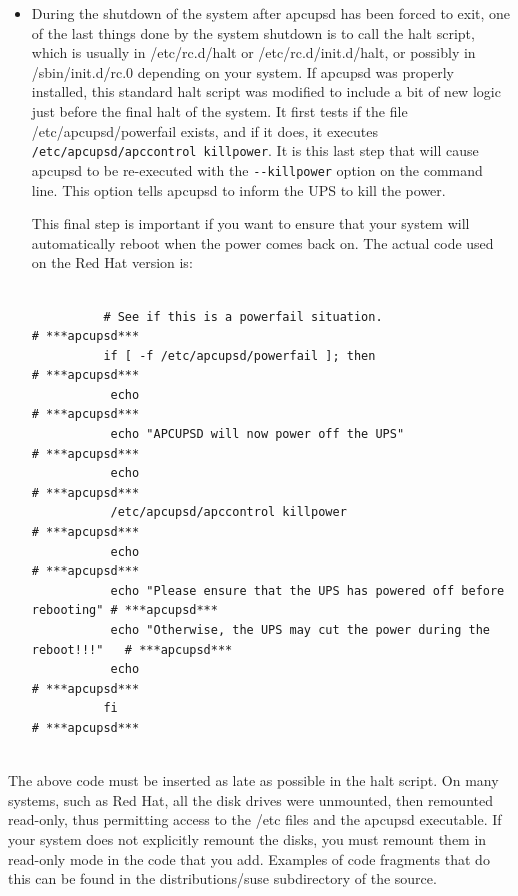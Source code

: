 {{{{{{{{{{{{{{{\begin{itemize}
Note that on Windows NT systems, apcupsd apparently continues to run as a
Service even though the machine is ``shutdown''.  
\item During the shutdown of the system after apcupsd has been forced to exit,
one of the last things done by the system shutdown is to call the halt script,
which is usually in /etc/rc.d/halt or /etc/rc.d/init.d/halt, or possibly in
/sbin/init.d/rc.0 depending on your system. If apcupsd was properly installed,
this standard halt script was modified to include a bit of new logic just
before the final halt of the system. It first tests if the file
/etc/apcupsd/powerfail exists, and if it does, it executes {\tt
/etc/apcupsd/apccontrol killpower}. It is this last step that will cause
apcupsd to be re-executed with the {\tt \verb{--{killpower} option on the command
line. This option tells apcupsd to inform the UPS to kill the power.  

This final step is important if you want to ensure that your system will
automatically reboot when the power comes back on. The actual code used on the
Red Hat version is:  

\footnotesize
\begin{verbatim}
          
          # See if this is a powerfail situation.                             # ***apcupsd***
          if [ -f /etc/apcupsd/powerfail ]; then                              # ***apcupsd***
           echo                                                               # ***apcupsd***
           echo "APCUPSD will now power off the UPS"                          # ***apcupsd***
           echo                                                               # ***apcupsd***
           /etc/apcupsd/apccontrol killpower                                  # ***apcupsd***
           echo                                                               # ***apcupsd***
           echo "Please ensure that the UPS has powered off before rebooting" # ***apcupsd***
           echo "Otherwise, the UPS may cut the power during the reboot!!!"   # ***apcupsd***
           echo                                                               # ***apcupsd***
          fi                                                                  # ***apcupsd***
     
\end{verbatim}
\normalsize

\end{itemize}

The above code must be inserted as late as possible in the halt script. On
many systems, such as Red Hat, all the disk drives were unmounted, then
remounted read-only, thus permitting access to the /etc files and the apcupsd
executable. If your system does not explicitly remount the disks, you must
remount them in read-only mode in the code that you add. Examples of code
fragments that do this can be found in the distributions/suse subdirectory of
the source.  

}}}}}}}}}}}}}}}
